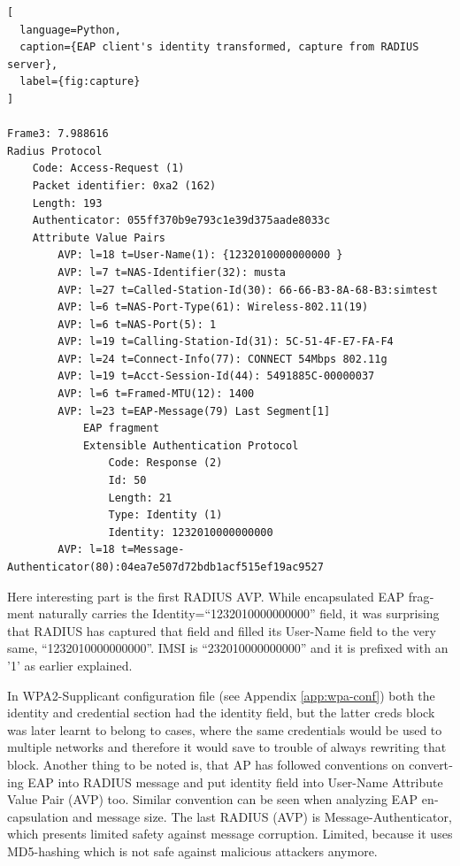 \documentclass[12pt,a4paper,english]{tutthesis}
\begin{document}
\begin{otherlanguage}{english}
\renewcommand{\lstlistingname}{Capture}
\begin{lstlisting}[
  language=Python,
  caption={EAP client's identity transformed, capture from RADIUS server},
  label={fig:capture}
]

Frame3: 7.988616
Radius Protocol
    Code: Access-Request (1)
    Packet identifier: 0xa2 (162)
    Length: 193
    Authenticator: 055ff370b9e793c1e39d375aade8033c
    Attribute Value Pairs
        AVP: l=18 t=User-Name(1): {1232010000000000 }
        AVP: l=7 t=NAS-Identifier(32): musta
        AVP: l=27 t=Called-Station-Id(30): 66-66-B3-8A-68-B3:simtest
        AVP: l=6 t=NAS-Port-Type(61): Wireless-802.11(19)
        AVP: l=6 t=NAS-Port(5): 1
        AVP: l=19 t=Calling-Station-Id(31): 5C-51-4F-E7-FA-F4
        AVP: l=24 t=Connect-Info(77): CONNECT 54Mbps 802.11g
        AVP: l=19 t=Acct-Session-Id(44): 5491885C-00000037
        AVP: l=6 t=Framed-MTU(12): 1400
        AVP: l=23 t=EAP-Message(79) Last Segment[1]
            EAP fragment
            Extensible Authentication Protocol
                Code: Response (2)
                Id: 50
                Length: 21
                Type: Identity (1)
                Identity: 1232010000000000
        AVP: l=18 t=Message-Authenticator(80):04ea7e507d72bdb1acf515ef19ac9527
\end{lstlisting}
\normalsize


Here interesting part is the first RADIUS AVP.
While encapsulated EAP fragment naturally carries the Identity=``1232010000000000''
field, it was surprising that RADIUS has captured that field and 
filled its User-Name field to the very same, ``1232010000000000''. 
IMSI is ``232010000000000'' and it is prefixed with
an '1' as earlier explained.

In WPA2-Supplicant configuration file (see Appendix \ref{app:wpa-conf}) both the identity and
credential section had the identity field, but the latter creds block
was later learnt to belong to cases, where the same credentials would
be used to multiple networks and therefore it would save to trouble of
always rewriting that block.
Another thing to be noted is, that AP has followed conventions on
converting EAP into RADIUS message and put identity field into
User-Name Attribute Value Pair (AVP) too.
Similar convention can be seen when analyzing EAP encapsulation and
message size. The last RADIUS (AVP) is 
Message-Authenticator, which presents limited safety against message 
corruption. Limited, because it uses MD5-hashing which is not safe
against malicious attackers anymore.


\end{otherlanguage}
\end{document}
